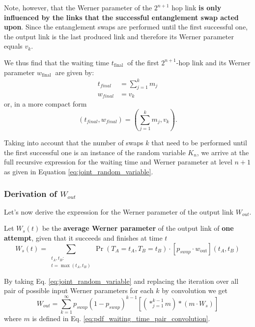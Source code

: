 \documentclass{masterthesis}
\begin{document}
Note, however, that the Werner parameter of the $2^{n+1}$ hop link \textbf{is only influenced by the links that the successful entanglement swap acted upon}. Since the entanglement swaps are performed until the first successful one, the output link is the last produced link and therefore its Werner parameter equals $v_{k}$. 

We thus find that the waiting time $t_{\text {final }}$ of the first $2^{n+1}$-hop link and its Werner parameter $w_{\text {final }}$ are given by:
\begin{align}
    t_{final} &= \sum_{j=1}^{k} m_{j} \\ 
    w_{final} &= v_k 
\end{align}
or, in a more compact form
\begin{equation}
    \left(t_{final}, w_{final}\right) = \left(\sum_{j=1}^{k} m_{j}, v_{k}\right) .
\end{equation}

Taking into account that the number of swaps $k$ that need to be performed until the first successful one is an instance of the random variable $K_{n}$, we arrive at the full recursive expression for the waiting time and Werner parameter at level $n+1$ as given in Equation \ref{eq:joint_random_variable}.

\subsubsection*{Derivation of $W_{out}$}
Let's now derive the expression for the Werner parameter of the output link $W_{out}$.

Let $W_{s}(t)$ be the \textbf{average Werner parameter} of the output link of \textbf{one attempt}, given that it succeeds and finishes at time $t$
\begin{equation}
    W_s(t) = \sum_{\substack{t_A, t_B:\\ t = \max(t_A, t_B)}} \Pr(T_A = t_A, T_B = t_B) \cdot [p_{swap} \cdot w_{\text{out}}](t_A, t_B)
\end{equation}

By taking Eq. \ref{eq:joint_random_variable} and replacing the iteration over all pair of possible input Werner parameters for each $k$ by convolution we get
\begin{equation}\label{werner_parameter_swap}
    W_{out} = \sum_{k=1}^{\infty} p_{swap} (1 - p_{swap})^{k-1} \left[ \left( \ast_{j=1}^{k-1} m \right) \ast \left( m \cdot W_{s} \right) \right]
\end{equation}
where $m$ is defined in Eq. \ref{eq:pdf_waiting_time_pair_convolution}.
\end{document}
